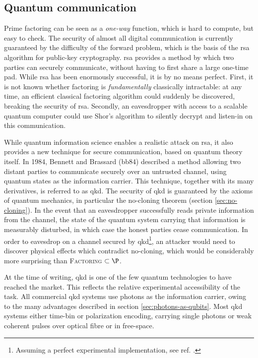 \subsection{Quantum communication} 
\label{sec:qkd}
Prime factoring can be seen as a \emph{one-way} function, which is hard to compute, but easy to check.  The security of almost all digital communication is currently guaranteed by the difficulty of the forward problem, which is the basis of the \gls{rsa} algorithm for public-key cryptography. \gls{rsa} provides a method by which two parties can securely communicate, without having to first share a large one-time pad. While \gls{rsa} has been enormously successful, it is by no means perfect. First, it is not known whether factoring is \emph{fundamentally} classically intractable: at any time, an efficient classical factoring algorithm could suddenly be discovered, breaking the security of \gls{rsa}. Secondly, an eavesdropper with access to a scalable quantum computer could use Shor's algorithm to silently decrypt and listen-in on this communication.

While quantum information science enables a realistic attack on \gls{rsa}, it also provides a new technique for secure communication, based on quantum theory itself. In 1984, Bennett and Brassard \cite{Bennett1984} (\acrshort{bb84}) described a method allowing two distant parties to communicate securely over an untrusted channel, using quantum states as the information carrier. This technique, together with its many derivatives, is referred to as \gls{qkd}. The security of \gls{qkd} is guaranteed by the axioms of quantum mechanics, in particular the no-cloning theorem (section \ref{sec:no-cloning}). In the event that an eavesdropper successfully reads private information from the channel, the state of the quantum system carrying that information is measurably disturbed, in which case the honest parties cease communication. In order to eavesdrop on a channel secured by \gls{qkd}\footnote{Assuming a perfect experimental implementation, see ref. \cite{Lydersen2010}.}, an attacker would need to discover physical effects which contradict no-cloning, which would be considerably more surprising than \textsc{Factoring} $\subset \P$.

At the time of writing, \gls{qkd} is one of the few quantum technologies to have reached the market. This reflects the relative experimental accessibility of the task. All commercial \gls{qkd} systems use photons as the information carrier, owing to the many advantages described in section \ref{sec:photons-as-qubits}. Most \gls{qkd} systems either time-bin or polarization encoding, carrying single photons or weak coherent pulses over optical fibre or in free-space. 

